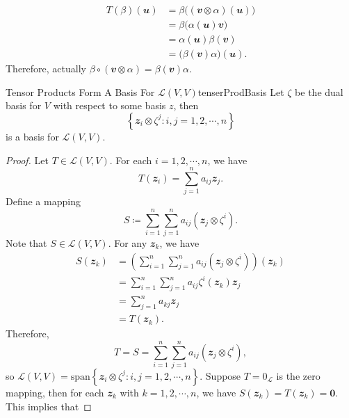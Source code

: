 \documentclass[math, code]{amznotes}
\theoremstyle{remark}
\newcommand{\zero}{\mathbf{0}}
\begin{document}
\begin{align*}
    T(\beta)(\mathbfit{u}) & = \beta\bigl((\mathbfit{v} \otimes \alpha)(\mathbfit{u})\bigr) \\
    & = \beta\bigl(\alpha(\mathbfit{u})\mathbfit{v}\bigr) \\
    & = \alpha(\mathbfit{u})\beta(\mathbfit{v}) \\
    & = \bigl(\beta(\mathbfit{v})\alpha\bigr)(\mathbfit{u}).
\end{align*}
Therefore, actually $\beta \circ (\mathbfit{v} \otimes \alpha) = \beta(\mathbfit{v})\alpha$.
\begin{probox}{Tensor Products Form A Basis For $\mathcal{L}(V, V)$}{tenserProdBasis}
    Let $\zeta$ be the dual basis for $V$ with respect to some basis $z$, then 
    \begin{equation*}
        \left\{\mathbfit{z}_i \otimes \zeta^j \colon i, j = 1, 2, \cdots, n\right\}
    \end{equation*}
    is a basis for $\mathcal{L}(V, V)$.
    \tcblower
    \begin{proof}
        Let $T \in \mathcal{L}(V, V)$. For each $i = 1, 2, \cdots, n$, we have
        \begin{equation*}
            T(\mathbfit{z}_i) = \sum_{j = 1}^{n}a_{ij}\mathbfit{z}_j.
        \end{equation*}
        Define a mapping
        \begin{equation*}
            S \coloneqq \sum_{i = 1}^{n}\sum_{j = 1}^{n}a_{ij}(\mathbfit{z}_j \otimes \zeta^i).
        \end{equation*}
        Note that $S \in \mathcal{L}(V, V)$. For any $\mathbfit{z}_k$, we have
        \begin{align*}
            S(\mathbfit{z}_k) & = \left(\sum_{i = 1}^{n}\sum_{j = 1}^{n}a_{ij}(\mathbfit{z}_j \otimes \zeta^i)\right)(\mathbfit{z}_k) \\
            & = \sum_{i = 1}^{n}\sum_{j = 1}^{n}a_{ij}\zeta^i(\mathbfit{z}_k)\mathbfit{z}_j \\
            & = \sum_{j = 1}^{n}a_{kj}\mathbfit{z}_j \\
            & = T(\mathbfit{z}_k).
        \end{align*}
        Therefore, 
        \begin{equation*}
            T = S = \sum_{i = 1}^{n}\sum_{j = 1}^{n}a_{ij}(\mathbfit{z}_j \otimes \zeta^i),
        \end{equation*} 
        so $\mathcal{L}(V, V) = \mathrm{span}\left\{\mathbfit{z}_i \otimes \zeta^j \colon i, j = 1, 2, \cdots, n\right\}$. Suppose $T = 0_{\mathcal{L}}$ is the zero mapping, then for each $\mathbfit{z}_k$ with $k = 1, 2, \cdots, n$, we have $S(\mathbfit{z}_k) = T(\mathbfit{z}_k) = \zero$. This implies that 

\end{proof}
\end{probox}
\end{document}
